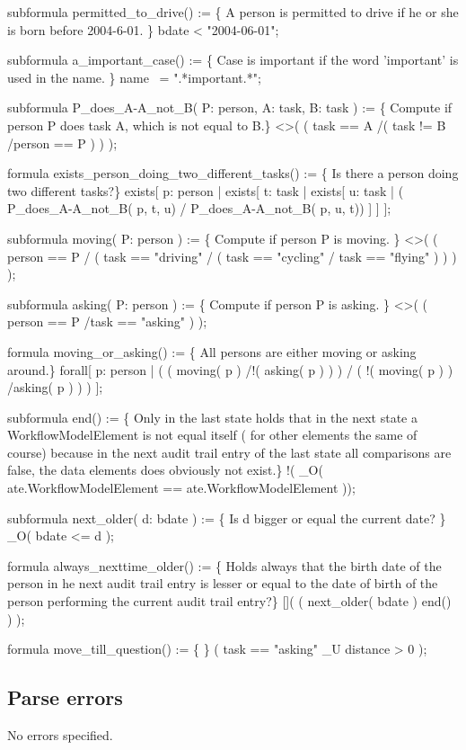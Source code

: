\begin{ltlcode}
subformula permitted_to_drive() := \{
 A person is permitted to drive if he or she is born before 2004-6-01. \}
  bdate < "2004-06-01";

subformula a_important_case() := \{
 Case is important if the word 'important' is used in the name. \}
  name ~= ".*important.*";  

subformula P_does_A-A_not_B( P: person, A: task, B: task ) := \{ 
 Compute if person P does task A, which is not equal to B.\}
  <>( ( task == A /\bs ( task != B /\bs person == P ) ) );

formula exists_person_doing_two_different_tasks() := \{
 Is there a person doing two different tasks?\}
  exists[ p: person   |
    exists[ t: task   |
      exists[ u: task |
        (  P_does_A-A_not_B( p, t, u) /\bs
           P_does_A-A_not_B( p, u, t)) 
      ]
    ]
  ];

subformula moving( P: person ) := \{
 Compute if person P is moving. \}
  <>( ( person == P /\bs
        (   task == "driving" \bs/ 
          ( task == "cycling" \bs/
            task == "flying"
          )
        )
    ) );

subformula asking( P: person ) := \{
 Compute if person P is asking. \}
  <>( ( person == P /\bs task == "asking" ) );

formula moving_or_asking() := \{
 All persons are either moving or asking around.\}
  forall[ p: person |
    ( 
      ( moving( p ) /\bs !( asking( p ) ) ) \bs/
      ( !( moving( p ) ) /\bs asking( p ) )
    )
  ];

subformula end() := \{ 
 Only in the last state holds that in the next state a
 WorkflowModelElement is not equal itself ( for other elements the same of
 course) because in the next audit trail entry of the last state all
 comparisons are false, the data elements does obviously not exist.\}
  !( _O( ate.WorkflowModelElement == ate.WorkflowModelElement ));

subformula next_older( d: bdate ) := \{
 Is d bigger or equal the current date? \}
  _O( bdate <= d );

formula always\_nexttime\_older() := \{
 Holds always that the birth date of the person in he next audit trail entry is
 lesser or equal to the date of birth of the person performing the current
 audit trail entry?\}
  []( ( next_older( bdate ) \/ end() ) );

formula move_till_question() := \{
 \}
  ( task == "asking" _U  distance > 0  );
\end{ltlcode}

\subsection{Parse errors}

    No errors specified.

